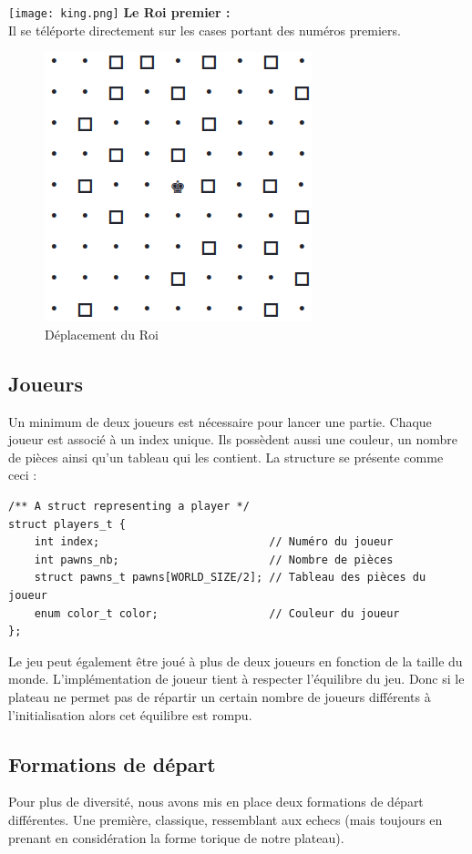         \texttt{[image: king.png]} \textbf{Le Roi premier :} \\
        Il se téléporte directement sur les cases portant des numéros premiers.
        \medbreak
                     \begin{figure}[H]
                \centering
                \includegraphics[scale=0.3]{img/dep_king.png}
                \caption{Déplacement du Roi}
                \label{fig:dep_king}
            \end{figure}
    
    \subsection{Joueurs}
        Un minimum de deux joueurs est nécessaire pour lancer une partie. Chaque joueur est associé à un index unique. Ils possèdent aussi une couleur, un nombre de pièces ainsi qu'un tableau qui les contient. La structure se présente comme ceci :
        \begin{lstlisting}
/** A struct representing a player */
struct players_t {
    int index;                          // Numéro du joueur 
    int pawns_nb;                       // Nombre de pièces
    struct pawns_t pawns[WORLD_SIZE/2]; // Tableau des pièces du joueur 
    enum color_t color;                 // Couleur du joueur
};\end{lstlisting}

        Le jeu peut également être joué à plus de deux joueurs en fonction de la taille du monde. L'implémentation de joueur tient à respecter l'équilibre du jeu. Donc si le plateau ne permet pas de répartir un certain nombre de joueurs différents à l'initialisation alors cet équilibre est rompu. 
    \subsection{Formations de départ}
            Pour plus de diversité, nous avons mis en place deux formations de départ différentes. Une première, classique, ressemblant aux echecs (mais toujours en prenant en considération la forme torique de notre plateau). \\
            
